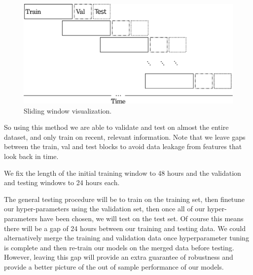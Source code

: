 \documentclass[a4paper, oneside, notitlepage]{book}
\begin{document}
\begin{figure}[htpb]
    \centering
    \includegraphics[width=1.0\textwidth]{./images/sliding_window.pdf}
    \caption{Sliding window visualization.}
    \label{fig:slidingwindow}
\end{figure}

So using this method we are able to validate and test on almost the entire dataset,
and only train on recent, relevant information. Note that we leave gaps between the train,
val and test blocks to avoid data leakage from features that look back in time.

We fix the length of the initial training window to 48 hours and the validation and testing windows to 24 hours each.

The general testing procedure will be to train on the training set, then finetune our hyper-parameters using
the validation set, then once all of our hyper-parameters have been chosen, 
we will test on the test set. Of course this means there will be a gap of 24 hours between our training
and testing data. We could alternatively merge the training and validation data once hyperparameter tuning is
complete and then re-train our models on the merged data before testing. However, leaving this gap
will provide an extra guarantee of robustness and provide a better picture of the out of sample
performance of our models.
\end{document}
